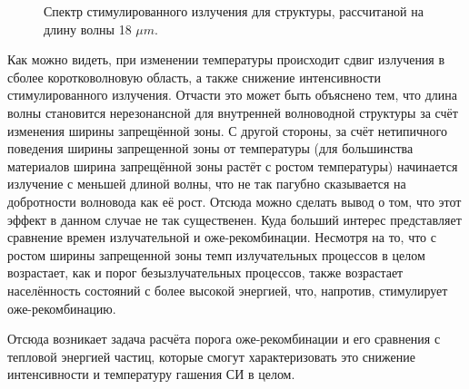 \documentclass[../main.tex]{subfiles}
\begin{document}
\begin{figure}[hbp!]
\begin{minipage}[h]{\linewidth}
\begin{center}
                \vspace{0.75cm}
                \caption{\label{spectre_18um}Спектр стимулированного излучения для структуры, 
                    рассчитаной на длину волны 18 $\mu m$.}
                \vspace{0.75cm}
            \end{center}
        \end{minipage}
    \end{figure}

    Как можно видеть, при изменении температуры происходит сдвиг излучения в сболее коротковолновую область, а также снижение 
    интенсивности стимулированного излучения. Отчасти это может быть объяснено тем, что длина волны становится 
    нерезонансной для внутренней волноводной структуры за счёт изменения ширины запрещённой зоны. С другой стороны, за счёт нетипичного поведения ширины запрещенной 
    зоны от температуры (для большинства материалов ширина запрещённой зоны растёт с ростом температуры) начинается излучение
    с меньшей длиной волны, что не так пагубно сказывается на добротности волновода как её рост. Отсюда можно сделать вывод о том, 
    что этот эффект в данном случае не так существенен. Куда больший интерес представляет сравнение времен излучательной и 
    оже-рекомбинации. Несмотря на то, что с ростом ширины запрещенной зоны темп излучательных процессов в целом возрастает, 
    как и порог безызлучательных процессов, также возрастает населённость состояний с более высокой энергией, что, напротив,
    стимулирует оже-рекомбинацию.

    Отсюда возникает задача расчёта порога оже-рекомбинации и его сравнения с тепловой энергией частиц, которые смогут характеризовать это 
    снижение интенсивности и температуру гашения СИ в целом.
\end{document}
